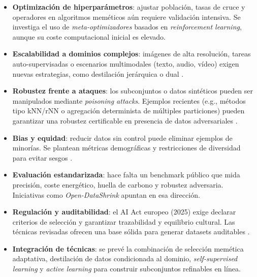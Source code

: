 \begin{itemize}
      \item \textbf{Optimización de hiperparámetros}: ajustar población, tasas de cruce y operadores en algoritmos meméticos aún requiere validación intensiva.
            Se investiga el uso de \textit{meta-optimizadores} basados en \textit{reinforcement learning}, aunque su coste computacional inicial es elevado.

      \item \textbf{Escalabilidad a dominios complejos}: imágenes de alta resolución, tareas auto-supervisadas o escenarios multimodales (texto, audio, vídeo) exigen nuevas estrategias, como destilación jerárquica o dual \cite{liGenerativeDatasetDistillation2024a, liGenerativeDatasetDistillation2024}.

      \item \textbf{Robustez frente a ataques}: los subconjuntos o datos sintéticos pueden ser manipulados mediante \textit{poisoning attacks}.
            Ejemplos recientes (e.g., métodos tipo kNN/rNN o agregación determinista de múltiples particiones) pueden garantizar una robustez certificable en presencia de datos adversariales \cite{jiaCertifiedRobustnessNearest2021, wangImprovedCertifiedDefenses2022}.

      \item \textbf{Bias y equidad}: reducir datos sin control puede eliminar ejemplos de minorías.
            Se plantean métricas demográficas y restricciones de diversidad para evitar sesgos \cite{pmlr-v81-buolamwini18a}.

      \item \textbf{Evaluación estandarizada}: hace falta un benchmark público que mida precisión, coste energético, huella de carbono y robustez adversaria.
            Iniciativas como \textit{Open-DataShrink} apuntan en esa dirección.

      \item \textbf{Regulación y auditabilidad}: el AI Act europeo (2025) exige declarar criterios de selección y garantizar trazabilidad y equilibrio cultural.
            Las técnicas revisadas ofrecen una base sólida para generar datasets auditables \cite{RegulationEU20242024}.

      \item \textbf{Integración de técnicas}: se prevé la combinación de selección memética adaptativa, destilación de datos condicionada al dominio, \textit{self-supervised learning} y \textit{active learning} para construir subconjuntos refinables en línea.
\end{itemize}